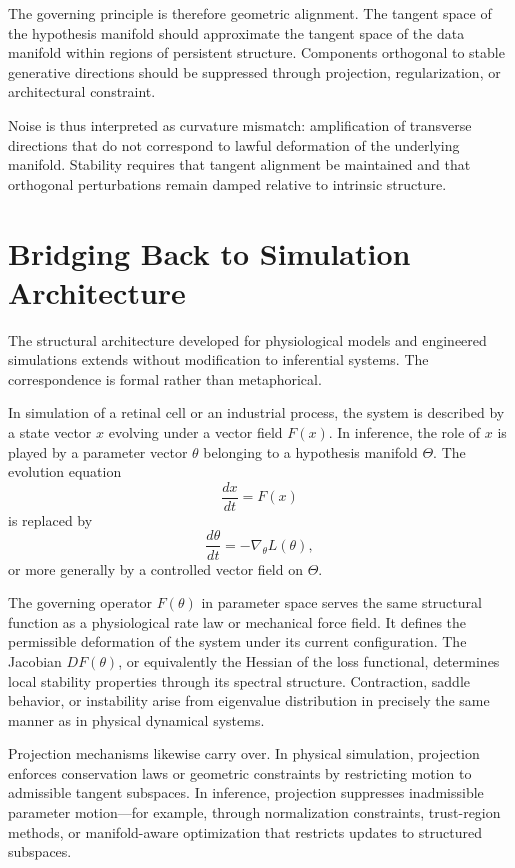 \documentclass[12pt]{book}
\begin{document}
The governing principle is therefore geometric alignment. The tangent space of the hypothesis manifold should approximate the tangent space of the data manifold within regions of persistent structure. Components orthogonal to stable generative directions should be suppressed through projection, regularization, or architectural constraint.

Noise is thus interpreted as curvature mismatch: amplification of transverse directions that do not correspond to lawful deformation of the underlying manifold. Stability requires that tangent alignment be maintained and that orthogonal perturbations remain damped relative to intrinsic structure.

\section{Bridging Back to Simulation Architecture}

The structural architecture developed for physiological models and engineered simulations extends without modification to inferential systems. The correspondence is formal rather than metaphorical.

In simulation of a retinal cell or an industrial process, the system is described by a state vector $x$ evolving under a vector field $F(x)$. In inference, the role of $x$ is played by a parameter vector $\theta$ belonging to a hypothesis manifold $\Theta$. The evolution equation
\[
\frac{dx}{dt} = F(x)
\]
is replaced by
\[
\frac{d\theta}{dt} = -\nabla_\theta L(\theta),
\]
or more generally by a controlled vector field on $\Theta$.

The governing operator $F(\theta)$ in parameter space serves the same structural function as a physiological rate law or mechanical force field. It defines the permissible deformation of the system under its current configuration. The Jacobian $DF(\theta)$, or equivalently the Hessian of the loss functional, determines local stability properties through its spectral structure. Contraction, saddle behavior, or instability arise from eigenvalue distribution in precisely the same manner as in physical dynamical systems.

Projection mechanisms likewise carry over. In physical simulation, projection enforces conservation laws or geometric constraints by restricting motion to admissible tangent subspaces. In inference, projection suppresses inadmissible parameter motion---for example, through normalization constraints, trust-region methods, or manifold-aware optimization that restricts updates to structured subspaces.
\end{document}
